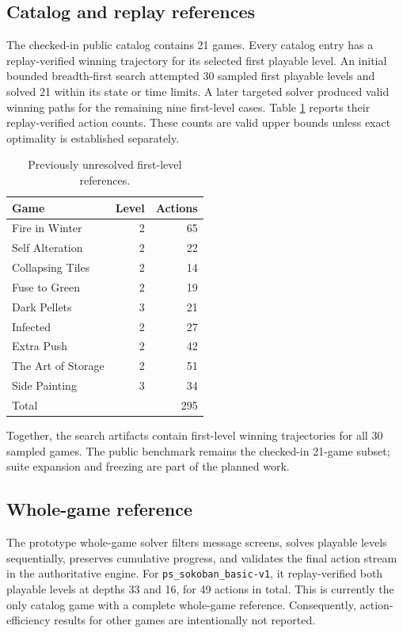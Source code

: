 \documentclass[sigconf,nonacm]{acmart}
\begin{document}
\subsection{Catalog and replay references}

The checked-in public catalog contains 21 games. Every catalog entry has a
replay-verified winning trajectory for its selected first playable level. An
initial bounded breadth-first search attempted 30 sampled first playable levels
and solved 21 within its state or time limits. A later targeted solver produced
valid winning paths for the remaining nine first-level cases. Table
\ref{tab:targeted} reports their replay-verified action counts. These counts are
valid upper bounds unless exact optimality is established separately.

\begin{table}[t]
  \caption{Previously unresolved first-level references.}
  \label{tab:targeted}
  \centering
  \small
  \begin{tabular}{lrr}
    \toprule
    Game & Level & Actions \\
    \midrule
    Fire in Winter     & 2 & 65 \\
    Self Alteration    & 2 & 22 \\
    Collapsing Tiles   & 2 & 14 \\
    Fuse to Green      & 2 & 19 \\
    Dark Pellets       & 3 & 21 \\
    Infected           & 2 & 27 \\
    Extra Push         & 2 & 42 \\
    The Art of Storage & 2 & 51 \\
    Side Painting      & 3 & 34 \\
    \midrule
    Total              &   & 295 \\
    \bottomrule
  \end{tabular}
\end{table}

Together, the search artifacts contain first-level winning trajectories for all
30 sampled games. The public benchmark remains the checked-in 21-game subset;
suite expansion and freezing are part of the planned work.

\subsection{Whole-game reference}

The prototype whole-game solver filters message screens, solves playable
levels sequentially, preserves cumulative progress, and validates the final
action stream in the authoritative engine. For
\texttt{ps\_sokoban\_basic-v1}, it replay-verified both playable levels at
depths 33 and 16, for 49 actions in total. This is currently the only catalog
game with a complete whole-game reference. Consequently, action-efficiency
results for other games are intentionally not reported.
\end{document}

